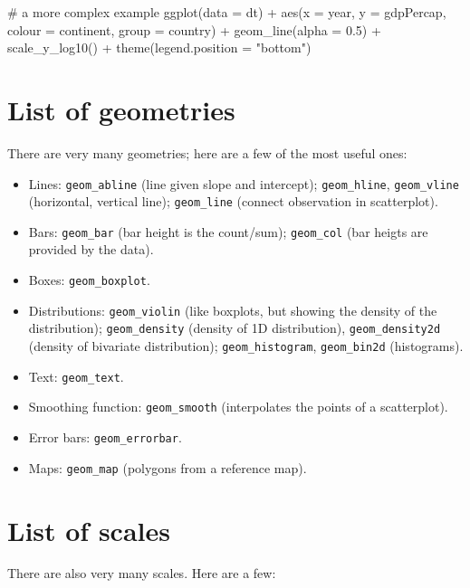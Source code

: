 \documentclass[
  letterpaper,
  DIV=11,
  numbers=noendperiod]{scrreprt}
\newenvironment{Shaded}{\begin{snugshade}}{\end{snugshade}}
\newcommand{\NormalTok}[1]{\textcolor[rgb]{0.00,0.23,0.31}{#1}}
\providecommand{\tightlist}{%
  \setlength{\itemsep}{0pt}\setlength{\parskip}{0pt}}\usepackage{longtable,booktabs,array}
\begin{document}
\begin{Shaded}
\begin{Highlighting}[]
\NormalTok{\# a more complex example}
\NormalTok{ggplot(data = dt) + }
\NormalTok{  aes(x = year, y = gdpPercap, colour = continent, group = country) +}
\NormalTok{  geom\_line(alpha = 0.5) +}
\NormalTok{  scale\_y\_log10() +}
\NormalTok{  theme(legend.position = "bottom")}
\end{Highlighting}
\end{Shaded}

\section{List of geometries}\label{list-of-geometries}

There are very many geometries; here are a few of the most useful ones:

\begin{itemize}
\tightlist
\item
  Lines: \texttt{geom\_abline} (line given slope and intercept);
  \texttt{geom\_hline}, \texttt{geom\_vline} (horizontal, vertical
  line); \texttt{geom\_line} (connect observation in scatterplot).
\item
  Bars: \texttt{geom\_bar} (bar height is the count/sum);
  \texttt{geom\_col} (bar heigts are provided by the data).
\item
  Boxes: \texttt{geom\_boxplot}.
\item
  Distributions: \texttt{geom\_violin} (like boxplots, but showing the
  density of the distribution); \texttt{geom\_density} (density of 1D
  distribution), \texttt{geom\_density2d} (density of bivariate
  distribution); \texttt{geom\_histogram}, \texttt{geom\_bin2d}
  (histograms).
\item
  Text: \texttt{geom\_text}.
\item
  Smoothing function: \texttt{geom\_smooth} (interpolates the points of
  a scatterplot).
\item
  Error bars: \texttt{geom\_errorbar}.
\item
  Maps: \texttt{geom\_map} (polygons from a reference map).
\end{itemize}

\section{List of scales}\label{list-of-scales}

There are also very many scales. Here are a few:
\end{document}
